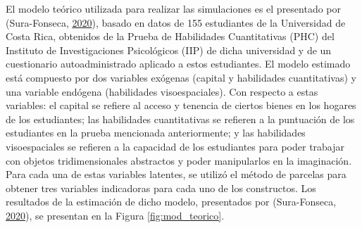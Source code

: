 \documentclass[
]{article}
\begin{document}
El modelo teórico utilizada para realizar las simulaciones es el
presentado por (Sura-Fonseca, \protect\hyperlink{ref-sura}{2020}),
basado en datos de 155 estudiantes de la Universidad de Costa Rica,
obtenidos de la Prueba de Habilidades Cuantitativas (PHC) del Instituto
de Investigaciones Psicológicos (IIP) de dicha universidad y de un
cuestionario autoadministrado aplicado a estos estudiantes. El modelo
estimado está compuesto por dos variables exógenas (capital y
habilidades cuantitativas) y una variable endógena (habilidades
visoespaciales). Con respecto a estas variables: el capital se refiere
al acceso y tenencia de ciertos bienes en los hogares de los
estudiantes; las habilidades cuantitativas se refieren a la puntuación
de los estudiantes en la prueba mencionada anteriormente; y las
habilidades visoespaciales se refieren a la capacidad de los estudiantes
para poder trabajar con objetos tridimensionales abstractos y poder
manipularlos en la imaginación. Para cada una de estas variables
latentes, se utilizó el método de parcelas para obtener tres variables
indicadoras para cada uno de los constructos. Los resultados de la
estimación de dicho modelo, presentados por (Sura-Fonseca,
\protect\hyperlink{ref-sura}{2020}), se presentan en la Figura
\ref{fig:mod_teorico}.
\end{document}
